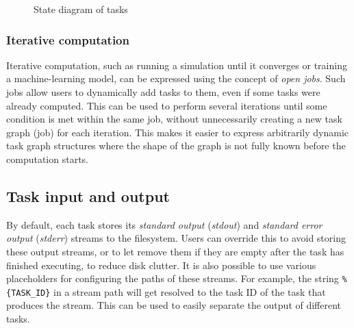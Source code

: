 \begin{figure}[h]
	\centering
	\caption{State diagram of \hyperqueue{} tasks}
	\label{fig:hq-task-state-diagram}
\end{figure}

\subsubsection*{Iterative computation}
Iterative computation, such as running a simulation until it converges or training a
machine-learning model, can be expressed using the concept of \emph{open jobs}. Such jobs
allow users to dynamically add tasks to them, even if some tasks were already computed. This can be
used to perform several iterations until some condition is met within the same job, without
unnecessarily creating a new task graph (job) for each iteration. This makes it easier to express
arbitrarily dynamic task graph structures where the shape of the graph is not fully known before
the computation starts.

\subsection{Task input and output}
\label{hq:task-input-and-output}
By default, each \hyperqueue{} task stores its \emph{standard output} (\emph{stdout}) and
\emph{standard error output} (\emph{stderr}) streams to the filesystem. Users can override this to avoid storing these
output streams, or to let \hq{} remove them if they are empty after the task has
finished executing, to reduce disk clutter. It is also possible to use various placeholders for
configuring the paths of these streams. For example, the string \texttt{\%\{TASK\_ID\}} in a stream
path will get resolved to the task ID of the task that produces the stream. This can be used to
easily separate the output of different tasks.

